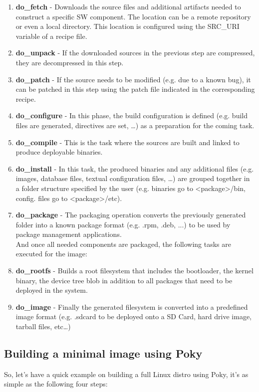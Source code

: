 \documentclass{article}
\begin{document}
\begin{enumerate}
  \item \textbf{do\_fetch} - Downloads the source files and additional artifacts needed to construct a specific SW component. The location can be a remote repository or even a local directory. This location is configured using the SRC\_URI variable of a recipe file.
  \item \textbf{do\_unpack} - If the downloaded sources in the previous step are compressed, they are decompressed in this step.
  \item \textbf{do\_patch} - If the source needs to be modified (e.g. due to a known bug), it can be patched in this step using the patch file indicated in the corresponding recipe.
  \item \textbf{do\_configure} - In this phase, the build configuration is defined (e.g. build files are generated, directives are set, …) as a preparation for the coming task.
  \item \textbf{do\_compile} - This is the task where the sources are built and linked to produce deployable binaries.
  \item \textbf{do\_install} - In this task, the produced binaries and any additional files (e.g. images, database files, textual configuration files, …) are grouped together in a folder structure specified by the user (e.g. binaries go to <package>/bin, config. files go to <package>/etc).
  \item \textbf{do\_package} - The packaging operation converts the previously generated folder into a known package format (e.g. .rpm, .deb, ...) to be used by package management applications.
  \\And once all needed components are packaged, the following tasks are executed for the image:
  \item \textbf{do\_rootfs} - Builds a root filesystem that includes the bootloader, the kernel binary, the device tree blob in addition to all packages that need to be deployed in the system.
  \item \textbf{do\_image} - Finally the generated filesystem is converted into a predefined image format (e.g. .sdcard to be deployed onto a SD Card, hard drive image, tarball files, etc…)
\end{enumerate}

\subsection{Building a minimal image using Poky}
So, let's have a quick example on building a full Linux distro using Poky, it's as simple as the following four steps:
\end{document}
